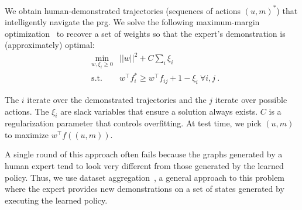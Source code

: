 We obtain human-demonstrated trajectories (sequences of actions $(u,
m)^{*}$) that intelligently navigate the {\sc prg}. We solve the
following maximum-margin optimization~\cite{taskar2005learning} to
recover a set of weights so that the expert's demonstration is
(approximately) optimal:
\begin{align*}
&\min_{w, \xi_i \geq 0} & ||w||^2 + C \sum_i \xi_i\\
&\text{s.t.} & w^{\top}f^*_i \geq w^{\top}f_{ij} + 1 - \xi_{i}\ \forall i, j \ .
\end{align*}

The $i$ iterate over the demonstrated trajectories and the $j$ iterate
over possible actions. The $\xi_{i}$ are slack variables that ensure
a solution always exists. $C$ is a regularization parameter that
controls overfitting. At test time, we pick $(u, m)$ to maximize
$w^{\top}f((u, m))$.

A single round of this approach often fails because the graphs generated by a
human expert tend to look very different from those generated by
the learned policy. Thus, we use dataset
aggregation~\cite{dagger}, a general approach to this problem where
the expert provides new demonstrations on a set of states generated by
executing the learned policy.


